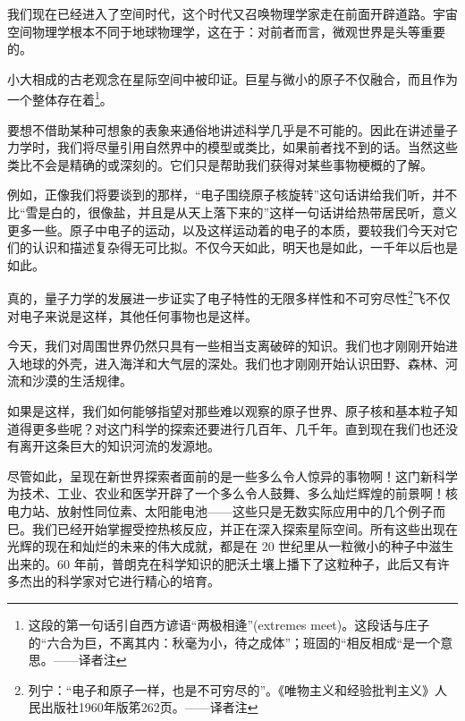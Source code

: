 我们现在已经进入了空间时代，这个时代又召唤物理学家走在前面开辟道路。宇宙空间物理学根本不同于地球物理学，这在于：对前者而言，微观世界是头等重要的。

小大相成的古老观念在星际空间中被印证。巨星与微小的原子不仅融合，而且作为一个整体存在着\footnote{这段的第一句话引自西方谚语“两极相逄”(extremes meet)。这段话与庄子的“六合为巨，不离其内：秋毫为小，待之成体”；班固的“相反相成“是一个意思。——译者注}。

要想不借助某种可想象的表象来通俗地讲述科学几乎是不可能的。因此在讲述量子力学时，我们将尽量引用自然界中的模型或类比，如果前者找不到的话。当然这些类比不会是精确的或深刻的。它们只是帮助我们获得对某些事物梗概的了解。

例如，正像我们将要谈到的那样，“电子围绕原子核旋转”这句话讲给我们听，并不比“雪是白的，很像盐，并且是从天上落下来的”这样一句话讲给热带居民听，意义更多一些。原子中电子的运动，以及这样运动着的电子的本质，要较我们今天对它们的认识和描述复杂得无可比拟。不仅今天如此，明天也是如此，一千年以后也是如此。

真的，量子力学的发展进一步证实了电子特性的无限多样性和不可穷尽性\footnote{列宁：“电子和原子一样，也是不可穷尽的”。《唯物主义和经验批判主义》人民出版社1960年版笫262页。——译者注}飞不仅对电子来说是这样，其他任何事物也是这样。

今天，我们对周围世界仍然只具有一些相当支离破碎的知识。我们也才刚刚开始进入地球的外壳，进入海洋和大气层的深处。我们也才刚刚开始认识田野、森林、河流和沙漠的生活规律。

如果是这样，我们如何能够指望对那些难以观察的原子世界、原子核和基本粒子知道得更多些呢？对这门科学的探索还要进行几百年、几千年。直到现在我们也还没有离开这条巨大的知识河流的发源地。

尽管如此，呈现在新世界探索者面前的是一些多么令人惊异的事物啊！这门新科学为技术、工业、农业和医学开辟了一个多么令人鼓舞、多么灿烂辉煌的前景啊！核电力站、放射性同位素、太阳能电池——这些只是无数实际应用中的几个例子而巳。我们已经开始掌握受控热核反应，并正在深入探索星际空间。所有这些出现在光辉的现在和灿烂的未来的伟大成就，都是在 20 世纪里从一粒微小的种子中滋生出来的。60 年前，普朗克在科学知识的肥沃土壤上播下了这粒种子，此后又有许多杰出的科学家对它进行精心的培育。
